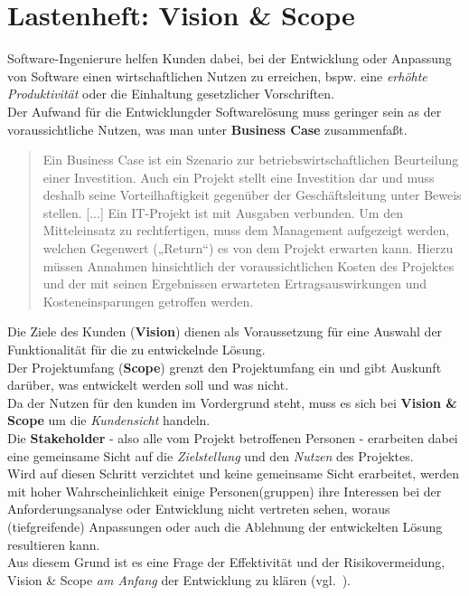 \section{Lastenheft: Vision \& Scope}

Software-Ingenierure helfen Kunden dabei, bei der Entwicklung oder Anpassung von Software einen wirtschaftlichen Nutzen zu erreichen, bspw. eine \textit{erhöhte Produktivität} oder die Einhaltung gesetzlicher Vorschriften.\\
Der Aufwand für die Entwicklungder Softwarelösung muss geringer sein as der voraussichtliche Nutzen, was man unter \textbf{Business Case} zusammenfaßt.

\blockquote[{\cite[11]{Brug09}}]{
    Ein Business Case ist ein Szenario zur betriebswirtschaftlichen Beurteilung einer Investition.
    Auch ein Projekt stellt eine Investition dar und
    muss deshalb seine Vorteilhaftigkeit gegenüber der Geschäftsleitung unter
    Beweis stellen. [...] Ein IT-Projekt ist mit Ausgaben verbunden. Um den Mitteleinsatz zu rechtfertigen, muss dem Management
    aufgezeigt werden, welchen Gegenwert („Return“) es von dem Projekt erwarten kann. Hierzu müssen Annahmen hinsichtlich der voraussichtlichen
    Kosten des Projektes und der mit seinen Ergebnissen erwarteten Ertragsauswirkungen und Kosteneinsparungen getroffen werden.
}

\noindent
Die Ziele des Kunden (\textbf{Vision}) dienen als Voraussetzung für eine Auswahl der Funktionalität für die zu entwickelnde Lösung.\\
Der Projektumfang (\textbf{Scope}) grenzt den Projektumfang ein und gibt Auskunft darüber, was entwickelt werden soll und was nicht.\\
Da der Nutzen für den kunden im Vordergrund steht, muss es sich bei \textbf{Vision \& Scope} um die \textit{Kundensicht} handeln.\\

\noindent
Die \textbf{Stakeholder} - also alle vom Projekt betroffenen Personen - erarbeiten dabei eine gemeinsame Sicht auf die \textit{Zielstellung} und den \textit{Nutzen} des Projektes.\\
Wird auf diesen Schritt verzichtet und keine gemeinsame Sicht erarbeitet, werden mit hoher Wahrscheinlichkeit einige Personen(gruppen) ihre Interessen bei der Anforderungsanalyse oder  Entwicklung nicht vertreten sehen, woraus (tiefgreifende) Anpassungen oder auch die Ablehnung der entwickelten Lösung resultieren kann.\\
Aus diesem Grund ist es eine Frage der Effektivität und der Risikovermeidung, Vision \& Scope \textit{am Anfang} der Entwicklung zu klären (vgl.~\cite[44]{Wed09}).

